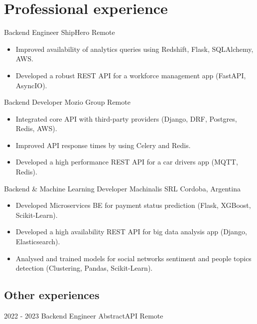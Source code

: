 
\section{Professional experience}
    {Backend Engineer} %
    {ShipHero} %
    {Remote} %
    {}
    {
      \begin{itemize} %
        \item {Improved availability of analytics queries using Redshift, Flask, SQLAlchemy, AWS.}
        \item {Developed a robust REST API for a workforce management app (FastAPI, AsyncIO).}
      \end{itemize}
    }
    {Backend Developer} %
    {Mozio Group} %
    {Remote} %
    {}
    {
      \begin{itemize} %
        \item {Integrated core API with third-party providers (Django, DRF, Postgres, Redis, AWS).}
        \item {Improved API response times by using Celery and Redis.}
        \item {Developed a high performance REST API for a car drivers app (MQTT, Redis).}
      \end{itemize}
    }
    {Backend \& Machine Learning Developer} %
    {Machinalis SRL} %
    {Cordoba, Argentina} %
    {}
    {
      \begin{itemize} %
        \item {Developed Microservices BE for payment status prediction (Flask, XGBoost, Scikit-Learn).}
        \item {Developed a high availability REST API for big data analysis app (Django, Elasticsearch).}
        \item {Analysed and trained models for social networks sentiment and people topics detection (Clustering, Pandas, Scikit-Learn).}
      \end{itemize}
    }

\subsection{Other experiences}
  \cventry
    {2022 - 2023} %
    {Backend Engineer} %
    {AbstractAPI} %
    {Remote} %
    {}
    {}

